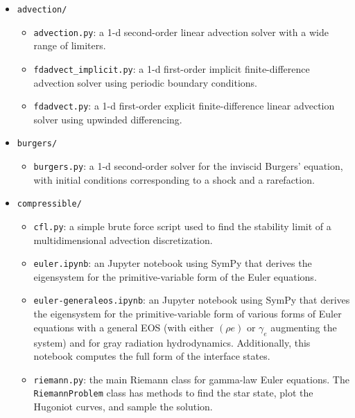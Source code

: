 \begin{itemize}

\item {\tt advection/}
  
  \begin{itemize}
  \item {\tt advection.py}: a 1-d second-order linear advection solver
    with a wide range of limiters.

  \item {\tt fdadvect\_implicit.py}: a 1-d first-order implicit
    finite-difference advection solver using periodic boundary
    conditions.

  \item {\tt fdadvect.py}: a 1-d first-order explicit
    finite-difference linear advection solver using upwinded
    differencing.

  \end{itemize}

\item {\tt burgers/}

  \begin{itemize}
  \item {\tt burgers.py}: a 1-d second-order solver for the inviscid
    Burgers' equation, with initial conditions corresponding to a
    shock and a rarefaction.

  \end{itemize}

\item {\tt compressible/}

  \begin{itemize}
  \item {\tt cfl.py}: a simple brute force script used to find the stability 
    limit of a multidimensional advection discretization.

  \item {\tt euler.ipynb}: an {\sf Jupyter} notebook using {\sf SymPy}
      that derives the eigensystem for the primitive-variable form
      of the Euler equations.

  \item {\tt euler-generaleos.ipynb}: an {\sf Jupyter} notebook using
    {\sf SymPy} that derives the eigensystem for the
    primitive-variable form of various forms of Euler equations with a
    general EOS (with either $(\rho e)$ or $\gamma_e$ augmenting the
    system) and for gray radiation hydrodynamics.  Additionally, this 
    notebook computes the full form of the interface states.
      
  \item {\tt riemann.py}: the main Riemann class for gamma-law Euler
    equations.  The {\tt RiemannProblem} class has methods to find
    the star state, plot the Hugoniot curves, and sample the solution.


\end{itemize}
\end{itemize}
